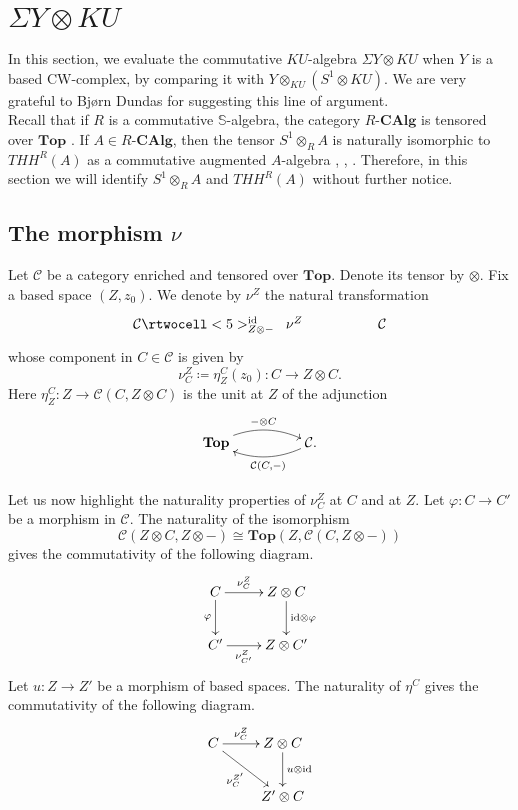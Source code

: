 \documentclass[a4paper,11pt]{amsart} %
\theoremstyle{definition} \newtheorem{defn}[equation]{Definition}
\theoremstyle{remark} \newtheorem{notation}[equation]{Notation}
\theoremstyle{plain} \newtheorem{teo}[equation]{Theorem}
\theoremstyle{plain} \newtheorem{lema}[equation]{Lemma}
\theoremstyle{plain} \newtheorem{prop}[equation]{Proposition}
\theoremstyle{plain} \newtheorem{corolario}[equation]{Corollary}
\theoremstyle{remark} \newtheorem{obs}[equation]{Remark}
\theoremstyle{remark} \newtheorem{sideobs}[equation]{Side remark}
\theoremstyle{remark} \newtheorem{ejercicio}[equation]{Exercise}
\theoremstyle{definition} \newtheorem{notn}[equation]{Notation}
\theoremstyle{remark} \newtheorem{ej}[equation]{Example}
\theoremstyle{remark} \newtheorem{contraej}[equation]{Counterexample}
\theoremstyle{plain} \newtheorem{conj}[equation]{Conjecture}
\renewcommand{\1}{\ensuremath{\mathbbm{1}}}
\renewcommand{\S}{\mathbb{S}}
\newcommand{\id}{\mathrm{id}}
\newcommand{\RCAlg}{\ensuremath{R}\mbox{-}\ensuremath{\mathbf{CAlg}}}
\newcommand{\Top}{\ensuremath{\mathbf{Top}}}
\numberwithin{equation}{section}
\begin{document}
\section{\texorpdfstring{$\Sigma Y\otimes KU$}{Sigma Y tensor KU}} \label{section:snku}
%

In this section, we evaluate the commutative $KU$-algebra $\Sigma Y \otimes KU$ when $Y$ is a based CW-complex, by comparing it with $Y\otimes_{KU}(S^1\otimes KU)$. We are very grateful to Bj{\o}rn Dundas for suggesting this line of argument.\\ 

Recall that if $R$ is a commutative $\S$-algebra, the category $\RCAlg$ is tensored over $\Top$ \cite[VII.2.9]{ekmm}. If $A\in \RCAlg$, then the tensor $S^1\otimes_R A$ is naturally isomorphic to $THH^R(A)$ as a commutative augmented $A$-algebra \cite{mc-schw-vo}, \cite[IX.3.3]{ekmm}, \cite[Section 3]{angeltveit-rognes}. Therefore, in this section we will identify $S^1\otimes_R A$ and $THH^R(A)$ without further notice.

\subsection{The morphism \texorpdfstring{$\nu$}{nu}}
\def\C{\mathcal{C}}
Let $\C$ be a category enriched and tensored over $\Top$. Denote its tensor by $\otimes$. Fix a based space $(Z,z_0)$. We denote by $\nu^Z$ the natural transformation
\begin{equation}\label{nuu}\xymatrix@C+2pc{\C \rtwocell<5>^{\id}_{Z\otimes -}{\;\;\nu^Z}  & \C}\end{equation}
whose component in $C\in \C$ is given by \begin{equation}\label{defnu}\nu^Z_C\coloneqq\eta_Z^C(z_0):C\to Z\otimes C.\end{equation} Here $\eta_Z^C:Z\to \C(C,Z\otimes C)$ is the unit at $Z$ of the adjunction 
\begin{equation} \label{adjo} \xymatrix@C+2pc{\Top \ar@/^.8pc/[r]^(.5){-\otimes C} & \C. \ar@/^.8pc/[l]^-{\C(C,-)}}
\end{equation}

Let us now highlight the naturality properties of $\nu^Z_C$ at $C$ and at $Z$. Let $\varphi:C\to C'$ be a morphism in $\C$. The naturality of the isomorphism \[\C(Z\otimes C,Z\otimes -)\cong \Top(Z,\C(C,Z\otimes -))\] gives the commutativity of the following diagram.
\begin{equation}\label{cuadradonu}\xymatrix{C\ar[d]_-\varphi \ar[r]^-{\nu^Z_C} & Z\otimes C \ar[d]^-{\id\otimes \varphi} \\ C' \ar[r]_-{\nu_{C'}^Z} & Z\otimes C'}\end{equation}
Let $u:Z\to Z'$ be a morphism of based spaces. The naturality of $\eta^C$ gives the commutativity of the following diagram.
\begin{equation}\label{nuu2}\xymatrix{C\ar[r]^-{\nu_C^Z} \ar[rd]_-{\nu_C^{Z'}} & Z\otimes C \ar[d]^-{u\otimes \id} \\ & Z'\otimes C }\end{equation}
\end{document}
